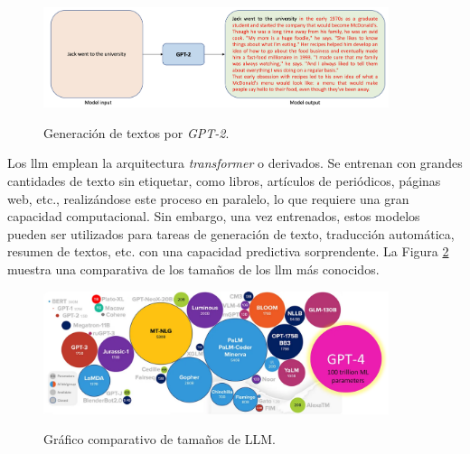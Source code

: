 \begin{figure}[H]
    \caption[Generación de textos por \emph{GPT-2}]{Generación de textos por \emph{GPT-2}.}
    \centering
    \includegraphics[width=0.9\textwidth]{./figuras/GPT2_text_generation.png}
    \label{fig:gpt2_text_generation}
\end{figure}

Los \gls{llm} emplean la arquitectura \emph{transformer} o derivados. Se entrenan con grandes cantidades de texto sin etiquetar, como libros, artículos de periódicos, páginas web, etc., realizándose este proceso en paralelo, lo que requiere una gran capacidad computacional. Sin embargo, una vez entrenados, estos modelos pueden ser utilizados para tareas de generación de texto, traducción automática, resumen de textos, etc. con una capacidad predictiva sorprendente. La Figura \ref{fig:llm_sizes} muestra una comparativa de los tamaños de los \gls{llm} más conocidos.

\begin{figure}[H]
    \caption[Gráfico comparativo de tamaños de LLM]{Gráfico comparativo de tamaños de LLM.}
    \centering
    \includegraphics[width=0.9\textwidth]{./figuras/LLMs_sizes.png}
    \label{fig:llm_sizes}
\end{figure}

